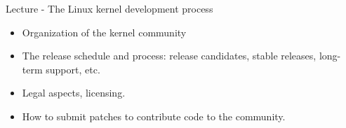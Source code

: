 \documentclass[a4paper,12pt,obeyspaces,spaces,hyphens]{article}
\begin{document}
\feagendaonecolumn
{Lecture - The Linux kernel development process}
{
  \begin{itemize}
  \item Organization of the kernel community
  \item The release schedule and process: release candidates, stable
    releases, long-term support, etc.
  \item Legal aspects, licensing.
  \item How to submit patches to contribute code to the community.
  \end{itemize}
}
\end{document}
